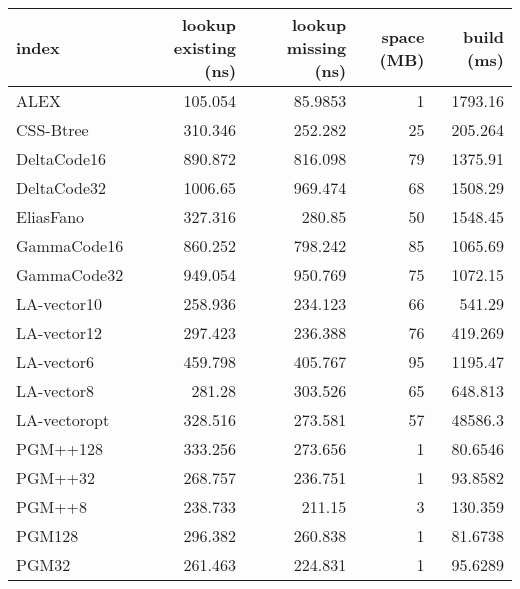 \begin{tabular}{lrrrr}
\hline
 index             &   lookup existing (ns) &   lookup missing (ns) &   space (MB) &      build (ms) \\
\hline
 ALEX              &               105.054  &               85.9853 &            1 &  1793.16        \\
 CSS-Btree         &               310.346  &              252.282  &           25 &   205.264       \\
 DeltaCode16       &               890.872  &              816.098  &           79 &  1375.91        \\
 DeltaCode32       &              1006.65   &              969.474  &           68 &  1508.29        \\
 EliasFano         &               327.316  &              280.85   &           50 &  1548.45        \\
 GammaCode16       &               860.252  &              798.242  &           85 &  1065.69        \\
 GammaCode32       &               949.054  &              950.769  &           75 &  1072.15        \\
 LA-vector10       &               258.936  &              234.123  &           66 &   541.29        \\
 LA-vector12       &               297.423  &              236.388  &           76 &   419.269       \\
 LA-vector6        &               459.798  &              405.767  &           95 &  1195.47        \\
 LA-vector8        &               281.28   &              303.526  &           65 &   648.813       \\
 LA-vectoropt      &               328.516  &              273.581  &           57 & 48586.3         \\
 PGM++128          &               333.256  &              273.656  &            1 &    80.6546      \\
 PGM++32           &               268.757  &              236.751  &            1 &    93.8582      \\
 PGM++8            &               238.733  &              211.15   &            3 &   130.359       \\
 PGM128            &               296.382  &              260.838  &            1 &    81.6738      \\
 PGM32             &               261.463  &              224.831  &            1 &    95.6289      \\

\end{tabular}
